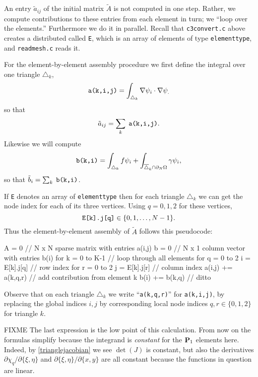 An entry $\tilde a_{ij}$ of the initial matrix $\tilde A$ is not computed in one step.  Rather, we compute contributions to these entries from each element in turn; we ``loop over the elements.''  Furthermore we do it in parallel.  Recall that \texttt{c3convert.c} above creates a distributed \pVec called \texttt{E}, which is an array of elements of type \texttt{elementtype}, and \texttt{readmesh.c} reads it.

For the element-by-element assembly procedure we first define the integral over one triangle $\triangle_k$,
\begin{equation}
\text{\texttt{a(k,i,j)}} = \int_{\triangle_k} \nabla \psi_i \cdot \nabla \psi_. \label{aelementintegral}
\end{equation}
so that
    $$\tilde a_{ij} = \sum_k \phantom{.}\text{\texttt{a(k,i,j)}}.$$
Likewise we will compute
\begin{equation}
\text{\texttt{b(k,i)}} = \int_{\triangle_k} f \psi_i + \int_{\overline{\triangle}_k \cap \partial_N\Omega} \gamma \psi_i, \label{belementintegral}
\end{equation}
so that $\tilde b_i = \sum_{k} \;\text{\texttt{b(k,i)}}$.

If \texttt{E} denotes an array of \texttt{elementtype} then for each triangle $\triangle_k$ we can get the node index for each of its three vertices.  Using $q=0,1,2$ for these vertices,
    $$\text{\texttt{E[k].j[q]}} \in \{0,1,\dots,N-1\}.$$
Thus the element-by-element assembly of $\tilde A$ follows this pseudocode:
\begin{code}
A = 0                           // N x N sparse matrix with entries a(i,j)
b = 0                           // N x 1 column vector with entries b(i)
for k = 0 to K-1                // loop through all elements
    for q = 0 to 2
        i = E[k].j[q]           // row index
        for r = 0 to 2
            j = E[k].j[r]       // column index
            a(i,j) += a(k,q,r)  // add contribution from element k
            b(i)   += b(k,q)    // ditto
\end{code}
\medskip\noindent
Observe that on each triangle $\triangle_k$ we write ``\texttt{a(k,q,r)}'' for \texttt{a(k,i,j)}, by replacing the global indices $i,j$ by corresponding local node indices $q,r\in\{0,1,2\}$ for triangle $k$.

FIXME The last expression is the low point of this calculation.  From now on the formulas simplify because the integrand is \emph{constant} for the $\mathbf{P}_1$ elements here.  Indeed, by \eqref{trianglejacobian} we see $\det(J)$ is constant, but also the derivatives $\partial \chi_q/\partial\{\xi,\eta\}$ and $\partial\{\xi,\eta\}/\partial\{x,y\}$ are all constant because the functions in question are linear.

